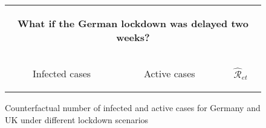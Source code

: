 \documentclass[12pt]{article}
\begin{document}
\begin{figure}[tbh]%
\caption
{Counterfactual number of infected and active cases for Germany and UK under different lockdown scenarios}%
\vspace{-0.2cm}%
\label{fig: Germany_UK_2w}

\begin{center}%
\hspace*{-0.6cm}%
\begin{tabular}
[c]{ccc}%
\multicolumn{3}{c}{%
\begin{footnotesize}%
\textbf{What if the German lockdown was delayed two weeks?}%
\end{footnotesize}%
\vspace{0.2cm}%
}\\%
\hspace*{-0.2cm}%
{\footnotesize Infected cases} & {\footnotesize Active cases} &
\hspace*{-0.8cm}%
\begin{footnotesize}%
$\mathcal{\hat{R}}_{et}$%
\end{footnotesize}%
\\%

\end{tabular}
\end{center}
\end{figure}
\end{document}
